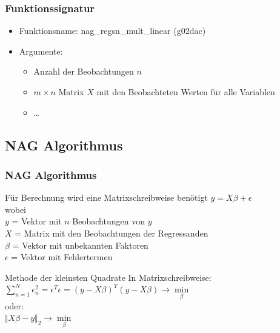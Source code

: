 \documentclass{beamer}
\begin{document}
\begin{frame}
  \frametitle{Funktionssignatur}
  
  \begin{itemize}
  \item Funktionsname: nag\_regsn\_mult\_linear (g02dac)
  \item Argumente:
    \begin{itemize}
    \item Anzahl der Beobachtungen $n$
    \item $m \times n$ Matrix $X$ mit den Beobachteten Werten für alle Variablen
    \item \dots
    \end{itemize}
  \end{itemize}

\end{frame}

\subsection{NAG Algorithmus}
\begin{frame}
  \frametitle{NAG Algorithmus}
 
  \begin{block}{Für Berechnung wird eine Matrixschreibweise benötigt}
    {\centering $y = X \beta + \epsilon$ \\}
    wobei \\
    \qquad $y$ = Vektor mit $n$ Beobachtungen von $y$ \\
    \qquad $X$ = Matrix mit den Beobachtungen der Regressanden \\
    \qquad $\beta$ = Vektor mit unbekannten Faktoren \\
    \qquad $\epsilon$ = Vektor mit Fehlertermen \\
  \end{block}
  
  \pause
  
  \begin{block}{Methode der kleinsten Quadrate}
    In Matrixschreibweise:\\
    {\centering
      $\sum\limits^{N}_{n=1} \epsilon^2_n = \epsilon^T \epsilon = (y - X \beta)^T (y - X \beta) \rightarrow \min\limits_{\beta}$\\}
    oder: \\
    {\centering
      $\Vert X\beta - y \Vert_2 \rightarrow \min\limits_{\beta}$
      \\}
  \end{block}

\end{frame}
\end{document}
